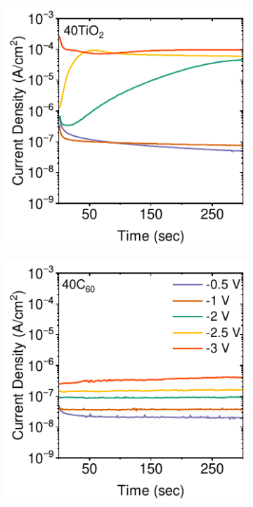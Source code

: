 \begin{figure}[!ht]
    \begin{subfigure}[b]{0.32\textwidth}
        \centering
        \includegraphics[width=\textwidth]{chapters/transport_layers/images/StaticJV_40TiO2.pdf}
        \caption{}
    \end{subfigure}
    \hfill
    \begin{subfigure}[b]{0.32\textwidth}
        \centering
        \includegraphics[width=\textwidth]{chapters/transport_layers/images/StaticJV_40C60.pdf}

\end{subfigure}
\end{figure}

